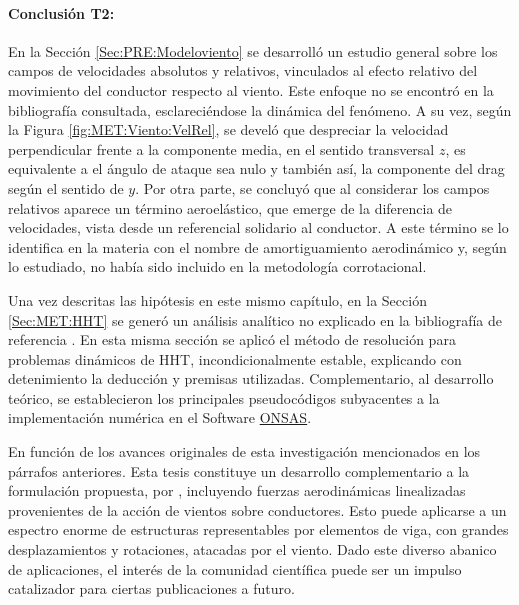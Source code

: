 \paragraph{Conclusión T2:}
En la Sección \ref{Sec:PRE:Modeloviento} se desarrolló un estudio general sobre los campos de velocidades absolutos y relativos, vinculados al efecto relativo del movimiento del conductor respecto al viento. Este enfoque no se encontró en la bibliografía consultada, esclareciéndose la dinámica del fenómeno. A su vez, según la Figura \ref{fig:MET:Viento:VelRel}, se develó que despreciar la velocidad perpendicular frente a la componente media, en el sentido transversal $z$,  es equivalente a el ángulo de ataque sea nulo y también así, la componente del drag según el sentido de $y$. Por otra parte, se concluyó que al considerar los campos relativos aparece un término aeroelástico, que emerge de la diferencia de velocidades, vista desde un referencial solidario al conductor. A este término se lo identifica en la materia con el nombre de amortiguamiento aerodinámico y, según lo estudiado, no había sido incluido en la metodología corrotacional. 

Una vez descritas las hipótesis en este mismo capítulo, en la Sección \ref{Sec:MET:HHT} se generó un análisis analítico no explicado en la bibliografía de referencia \citep{Le2014}. En esta misma sección se aplicó el método de resolución para problemas dinámicos de HHT, incondicionalmente estable, explicando con detenimiento la deducción y premisas utilizadas. Complementario, al desarrollo teórico, se establecieron los principales pseudocódigos subyacentes a la implementación numérica en el Software \href{https://github.com/ONSAS/ONSAS/}{ONSAS}.

En función de los avances originales de esta investigación mencionados en los párrafos anteriores. Esta tesis constituye un desarrollo complementario a la formulación propuesta, por \cite{Le2014}, incluyendo fuerzas aerodinámicas linealizadas provenientes de la acción de vientos sobre conductores. Esto puede aplicarse a un espectro enorme de estructuras representables por elementos de viga, con grandes desplazamientos y rotaciones, atacadas por el viento. Dado este diverso abanico de aplicaciones, el interés de la comunidad científica puede ser un impulso catalizador para ciertas publicaciones a futuro.

